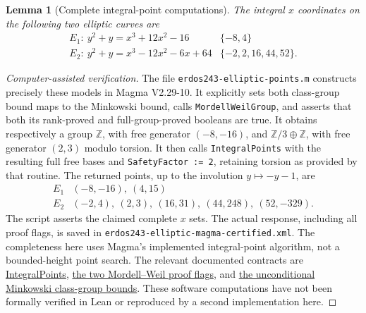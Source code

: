 \documentclass[11pt]{article}
\newtheorem{lemma}{Lemma}
\newcommand{\Z}{\mathbb Z}
\begin{document}
\begin{lemma}[Complete integral-point computations]\label{lem:integral}
The integral $x$ coordinates on the following two elliptic curves are
\[
\begin{array}{c|l}
 E_1:\ y^2+y=x^3+12x^2-16 & \{-8,4\}\\
 E_2:\ y^2+y=x^3-12x^2-6x+64 & \{-2,2,16,44,52\}.
\end{array}
\]
\end{lemma}
\begin{proof}[Computer-assisted verification]
The file \texttt{erdos243-elliptic-points.m} constructs precisely these
models in Magma V2.29-10. It explicitly sets both class-group bound maps
to the Minkowski bound, calls \texttt{MordellWeilGroup}, and asserts that
both its rank-proved and full-group-proved booleans are true. It obtains
respectively a group $\Z$, with free generator $(-8,-16)$, and
$\Z/3\oplus\Z$, with free generator $(2,3)$ modulo torsion. It then
calls \texttt{IntegralPoints} with the resulting full free bases and
\texttt{SafetyFactor := 2}, retaining torsion as provided by that routine.
The returned points, up to the involution $y\mapsto-y-1$, are
\[
\begin{array}{c|l}
 E_1&(-8,-16),\ (4,15)\\
 E_2&(-2,4),\ (2,3),\ (16,31),\ (44,248),\ (52,-329).
\end{array}
\]
The script asserts the claimed complete $x$ sets. The actual response,
including all proof flags, is saved in
\texttt{erdos243-elliptic-magma-certified.xml}.
The completeness here uses Magma's implemented integral-point algorithm,
not a bounded-height point search. The relevant documented contracts are
\href{https://magma.maths.usyd.edu.au/magma/handbook/text/1567}{IntegralPoints},
\href{https://magma.maths.usyd.edu.au/magma/releasenotes/2/21/}{the two
Mordell--Weil proof flags}, and
\href{https://magma.maths.usyd.edu.au/magma/handbook/text/416}{the unconditional
Minkowski class-group bounds}. These software computations have not been
formally verified in Lean or reproduced by a second implementation here.
\end{proof}
\end{document}
